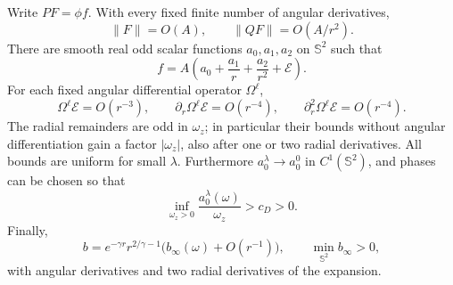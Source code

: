 \begin{lemma}
\label{lem:channel-expansion}
Write \(PF=\phi f\).  With every fixed finite number of angular
derivatives,
\begin{equation}
 \|F\|=O(A),\qquad \|QF\|=O(A/r^2).
 \label{eq:channel-leading-bounds}
\end{equation}
There are smooth real odd scalar functions \(a_0,a_1,a_2\) on
\(\mathbb S^2\) such that
\begin{equation}
 f=A\left(a_0+\frac{a_1}{r}+\frac{a_2}{r^2}+\mathcal E\right).
 \label{eq:projected-channel-expansion}
\end{equation}
For each fixed angular differential operator \(\Omega^\ell\),
\begin{equation}
 \Omega^\ell\mathcal E=O(r^{-3}),\qquad
 \partial_r\Omega^\ell\mathcal E=O(r^{-4}),\qquad
 \partial_r^2\Omega^\ell\mathcal E=O(r^{-4}).
 \label{eq:scalar-remainder-derivatives}
\end{equation}
The radial remainders are odd in \(\omega_z\); in particular their
bounds without angular differentiation gain a factor
\(|\omega_z|\), also after one or two radial derivatives.
All bounds are uniform for small \(\lambda\).
Furthermore \(a_0^\lambda\to a_0^0\) in \(C^1(\mathbb S^2)\), and
phases can be chosen so that
\begin{equation}
 \inf_{\omega_z>0}\frac{a_0^\lambda(\omega)}{\omega_z}>c_D>0.
 \label{eq:simple-angular-zero}
\end{equation}
Finally,
\begin{equation}
 b=e^{-\gamma r}r^{2/\gamma-1}
       \bigl(b_\infty(\omega)+O(r^{-1})\bigr),\qquad
 \min_{\mathbb S^2}b_\infty>0,
 \label{eq:fast-orbital-expansion}
\end{equation}
with angular derivatives and two radial derivatives of the expansion.
\end{lemma}


